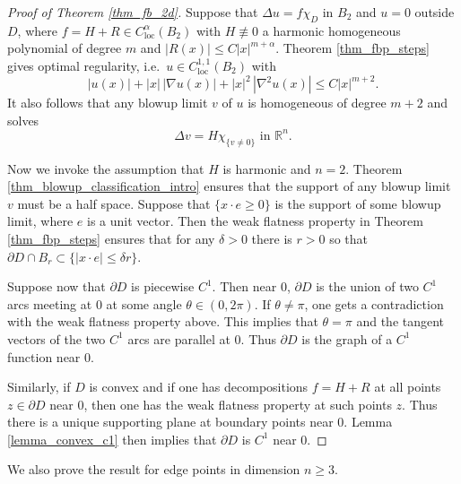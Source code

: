 \documentclass[11pt,a4paper]{amsart}
\theoremstyle{definition}
\numberwithin{equation}{section}
\newcommand{\mR}{\mathbb{R}}                    %
\newcommand{\abs}[1]{\lvert #1 \rvert}          %
\newcommand{\ol}[1]{\overline{#1}}
\newcommand{\supp}{\mathrm{supp}}
\newcommand{\p}{\partial}
\begin{document}
\begin{proof}[Proof of Theorem \ref{thm_fb_2d}]
Suppose that $\Delta u = f \chi_D$ in $B_2$ and $u=0$ outside $D$, where $f = H + R \in C^{\alpha}_{\mathrm{loc}}(B_2)$ with $H \not\equiv 0$ a harmonic homogeneous polynomial of degree $m$ and $|R(x)| \leq C |x|^{m+\alpha}$. Theorem \ref{thm_fbp_steps} gives optimal regularity, i.e.\ $u \in C^{1,1}_{\mathrm{loc}}(B_2)$ with 
\[
|u(x)| + |x| \,|\nabla u(x)| + |x|^2 \, |\nabla^2 u(x)| \leq C |x|^{m+2}.
\]
It also follows that any blowup limit $v$ of $u$ is homogeneous of degree $m+2$ and solves 
\[
\Delta v = H \chi_{ \{ v \neq 0 \} } \text{ in $\mR^n$.}
\]

Now we invoke the assumption that $H$ is harmonic and $n=2$. Theorem \ref{thm_blowup_classification_intro} ensures that the support of any blowup limit $v$ must be a half space. Suppose that $\{x \cdot e \geq 0 \}$ is the support of some blowup limit, where $e$ is a unit vector. Then the weak flatness property in Theorem \ref{thm_fbp_steps} ensures that for any $\delta > 0$ there is $r > 0$ so that $\p D \cap B_{r} \subset \{ \abs{x \cdot e} \leq \delta r \}$.

Suppose now that $\p D$ is piecewise $C^1$. Then near $0$, $\p D$ is the union of two $C^1$ arcs meeting at $0$ at some angle $\theta \in (0,2\pi)$. If $\theta \neq \pi$, one gets a contradiction with the weak flatness property above. This implies that $\theta = \pi$ and the tangent vectors of the two $C^1$ arcs are parallel at $0$. Thus $\p D$ is the graph of a $C^1$ function near $0$.

Similarly, if $D$ is convex and if one has decompositions $f = H + R$ at all points $z \in \p D$ near $0$, then one has the weak flatness property at such points $z$. Thus there is a unique supporting plane at boundary points near $0$. Lemma \ref{lemma_convex_c1} then implies that $\p D$ is $C^1$ near $0$.


\end{proof}

We also prove the result for edge points in dimension $n \geq 3$.
\end{document}

